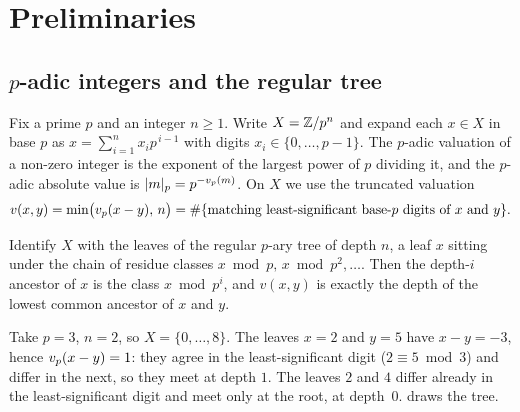 \section{Preliminaries}
\label{sec:preliminaries}

\subsection{$p$-adic integers and the regular tree}

Fix a prime $p$ and an integer $n \ge 1$. Write $X = \mathbb{Z}/p^{n}$ and expand each $x \in X$ in
base $p$ as $x = \sum_{i=1}^{n} x_i p^{\,i-1}$ with digits $x_i \in \{0, \dots, p-1\}$.
The $p$-adic valuation of a non-zero integer is the exponent of the largest power of
$p$ dividing it, and the $p$-adic absolute value is $\lvert m\rvert_p = p^{-v_p(m)}$. On $X$
we use the truncated valuation
\begin{equation}
  \label{eq:valuation}
  v(x, y) = \min\bigl(v_p(x - y),\, n\bigr)
  = \#\{\text{matching least-significant base-$p$ digits of $x$ and $y$}\} .
\end{equation}

Identify $X$ with the leaves of the regular $p$-ary tree of depth $n$, a leaf $x$
sitting under the chain of residue classes $x \bmod p, \, x \bmod p^{2}, \dots$. Then
the depth-$i$ ancestor of $x$ is the class $x \bmod p^{i}$, and $v(x,y)$ is exactly the
depth of the lowest common ancestor of $x$ and $y$.

\begin{example}
  \label{ex:padic-tree}
  Take $p = 3$, $n = 2$, so $X = \{0, \dots, 8\}$. The leaves $x = 2$ and $y = 5$ have
  $x - y = -3$, hence $v_p(x-y) = 1$: they agree in the least-significant digit
  ($2 \equiv 5 \bmod 3$) and differ in the next, so they meet at depth $1$. The leaves
  $2$ and $4$ differ already in the least-significant digit and meet only at the root,
  at depth~$0$.  draws the tree.
\end{example}

